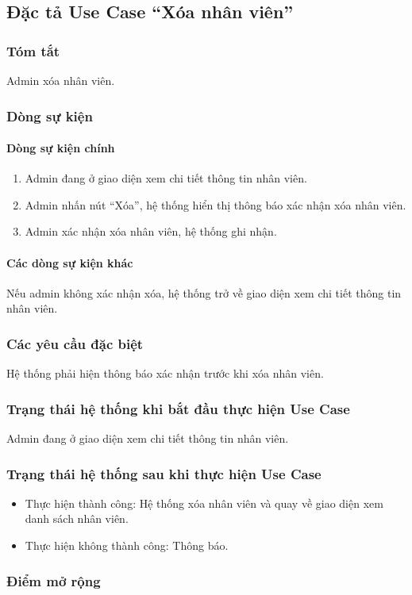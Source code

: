 \subsection{Đặc tả Use Case ``Xóa nhân viên''}

\subsubsection{Tóm tắt}
Admin xóa nhân viên.

\subsubsection{Dòng sự kiện}
\paragraph{\textbf{Dòng sự kiện chính}}
\begin{enumerate}
  \item Admin đang ở giao diện xem chi tiết thông tin nhân viên.
  \item Admin nhấn nút ``Xóa'', hệ thống hiển thị thông báo xác nhận xóa nhân viên.
  \item Admin xác nhận xóa nhân viên, hệ thống ghi nhận.
\end{enumerate}

\paragraph{\textbf{Các dòng sự kiện khác}}
Nếu admin không xác nhận xóa, hệ thống trở về giao diện xem chi tiết thông tin nhân viên.

\subsubsection{Các yêu cầu đặc biệt}
Hệ thống phải hiện thông báo xác nhận trước khi xóa nhân viên.

\subsubsection{Trạng thái hệ thống khi bắt đầu thực hiện Use Case}
Admin đang ở giao diện xem chi tiết thông tin nhân viên.

\subsubsection{Trạng thái hệ thống sau khi thực hiện Use Case}
\begin{itemize}
  \item Thực hiện thành công: Hệ thống xóa nhân viên và quay về giao diện xem danh sách nhân viên.
  \item Thực hiện không thành công: Thông báo.
\end{itemize}

\subsubsection{Điểm mở rộng}